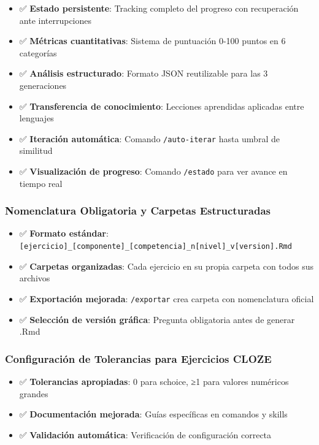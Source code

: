 \documentclass[
]{article}
\providecommand{\tightlist}{%
  \setlength{\itemsep}{0pt}\setlength{\parskip}{0pt}}
\begin{document}
\begin{itemize}
\tightlist
\item
  ✅ \textbf{Estado persistente}: Tracking completo del progreso con
  recuperación ante interrupciones
\item
  ✅ \textbf{Métricas cuantitativas}: Sistema de puntuación 0-100 puntos
  en 6 categorías
\item
  ✅ \textbf{Análisis estructurado}: Formato JSON reutilizable para las
  3 generaciones
\item
  ✅ \textbf{Transferencia de conocimiento}: Lecciones aprendidas
  aplicadas entre lenguajes
\item
  ✅ \textbf{Iteración automática}: Comando \texttt{/auto-iterar} hasta
  umbral de similitud
\item
  ✅ \textbf{Visualización de progreso}: Comando \texttt{/estado} para
  ver avance en tiempo real
\end{itemize}

\subsubsection{Nomenclatura Obligatoria y Carpetas
Estructuradas}\label{nomenclatura-obligatoria-y-carpetas-estructuradas}

\begin{itemize}
\tightlist
\item
  ✅ \textbf{Formato estándar}:
  \texttt{{[}ejercicio{]}\_{[}componente{]}\_{[}competencia{]}\_n{[}nivel{]}\_v{[}version{]}.Rmd}
\item
  ✅ \textbf{Carpetas organizadas}: Cada ejercicio en su propia carpeta
  con todos sus archivos
\item
  ✅ \textbf{Exportación mejorada}: \texttt{/exportar} crea carpeta con
  nomenclatura oficial
\item
  ✅ \textbf{Selección de versión gráfica}: Pregunta obligatoria antes
  de generar .Rmd
\end{itemize}

\subsubsection{Configuración de Tolerancias para Ejercicios
CLOZE}\label{configuraciuxf3n-de-tolerancias-para-ejercicios-cloze}

\begin{itemize}
\tightlist
\item
  ✅ \textbf{Tolerancias apropiadas}: 0 para schoice, ≥1 para valores
  numéricos grandes
\item
  ✅ \textbf{Documentación mejorada}: Guías específicas en comandos y
  skills
\item
  ✅ \textbf{Validación automática}: Verificación de configuración
  correcta
\end{itemize}
\end{document}
